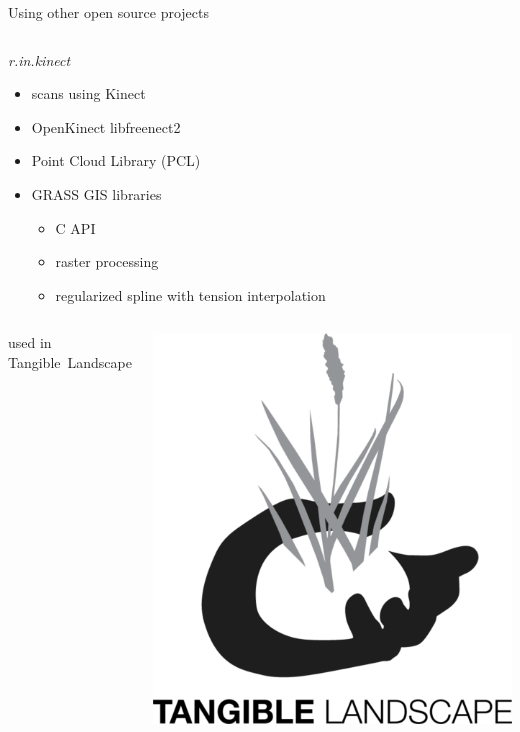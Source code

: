 \documentclass[xcolor={dvipsnames,usenames},beamer,aspectratio=43]{beamer}
\newcommand{\module}[1]{\emph{#1}}
\begin{document}
\begin{frame}{Using other open source projects}

\begin{columns}
\begin{column}{0.5\textwidth}

\begin{block}{\module{r.in.kinect}}
 \begin{itemize}
  \item scans using Kinect
  \item OpenKinect libfreenect2
  \item Point Cloud Library (PCL)
  \item GRASS GIS libraries
  \begin{itemize}
    \item C API
    \item raster processing
    \item regularized spline with tension interpolation
  \end{itemize}
 \end{itemize}
\end{block}

\begin{columns}
\begin{column}{0.6\textwidth}
\small

used in Tangible~Landscape

\end{column}
\begin{column}{0.2\textwidth}

\includegraphics[width=\textwidth]{logos/tangible_landscape}


\end{column}
\end{columns}
\end{column}
\end{columns}
\end{frame}
\end{document}
